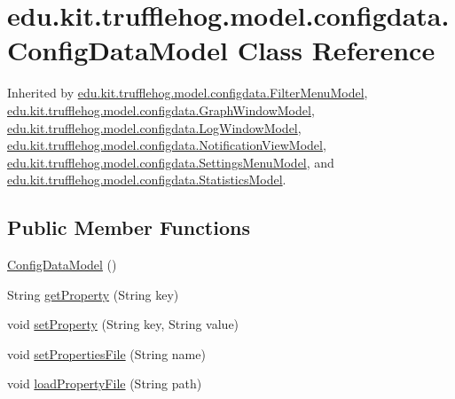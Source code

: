 \hypertarget{classedu_1_1kit_1_1trufflehog_1_1model_1_1configdata_1_1_config_data_model}{}\section{edu.\+kit.\+trufflehog.\+model.\+configdata.\+Config\+Data\+Model Class Reference}
\label{classedu_1_1kit_1_1trufflehog_1_1model_1_1configdata_1_1_config_data_model}


Inherited by \hyperlink{classedu_1_1kit_1_1trufflehog_1_1model_1_1configdata_1_1_filter_menu_model}{edu.\+kit.\+trufflehog.\+model.\+configdata.\+Filter\+Menu\+Model}, \hyperlink{classedu_1_1kit_1_1trufflehog_1_1model_1_1configdata_1_1_graph_window_model}{edu.\+kit.\+trufflehog.\+model.\+configdata.\+Graph\+Window\+Model}, \hyperlink{classedu_1_1kit_1_1trufflehog_1_1model_1_1configdata_1_1_log_window_model}{edu.\+kit.\+trufflehog.\+model.\+configdata.\+Log\+Window\+Model}, \hyperlink{classedu_1_1kit_1_1trufflehog_1_1model_1_1configdata_1_1_notification_view_model}{edu.\+kit.\+trufflehog.\+model.\+configdata.\+Notification\+View\+Model}, \hyperlink{classedu_1_1kit_1_1trufflehog_1_1model_1_1configdata_1_1_settings_menu_model}{edu.\+kit.\+trufflehog.\+model.\+configdata.\+Settings\+Menu\+Model}, and \hyperlink{classedu_1_1kit_1_1trufflehog_1_1model_1_1configdata_1_1_statistics_model}{edu.\+kit.\+trufflehog.\+model.\+configdata.\+Statistics\+Model}.

\subsection*{Public Member Functions}
\begin{DoxyCompactItemize}
\item 
\hyperlink{classedu_1_1kit_1_1trufflehog_1_1model_1_1configdata_1_1_config_data_model_a827eb9f7469d26bc730ec5c81480246a}{Config\+Data\+Model} ()
\item 
String \hyperlink{classedu_1_1kit_1_1trufflehog_1_1model_1_1configdata_1_1_config_data_model_a946667515c9fb5ab39e3e2f6884c4b73}{get\+Property} (String key)
\item 
void \hyperlink{classedu_1_1kit_1_1trufflehog_1_1model_1_1configdata_1_1_config_data_model_a8753d9d8d42a610805ffc57a5760de14}{set\+Property} (String key, String value)
\item 
void \hyperlink{classedu_1_1kit_1_1trufflehog_1_1model_1_1configdata_1_1_config_data_model_ae130887f94da803c6355df743b83b6cc}{set\+Properties\+File} (String name)
\item 
void \hyperlink{classedu_1_1kit_1_1trufflehog_1_1model_1_1configdata_1_1_config_data_model_a54a23d4904aae198dbee7e63af5e81ee}{load\+Property\+File} (String path)
\end{DoxyCompactItemize}



